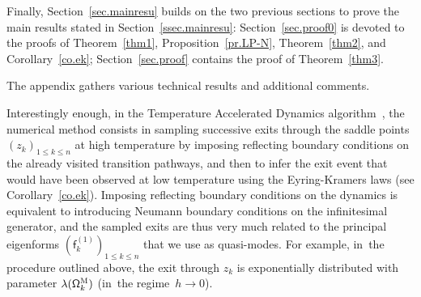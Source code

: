 Finally, Section~\ref{sec.mainresu} builds on the two previous sections
to prove the main results stated in Section~\ref{ssec.mainresu}: Section~\ref{sec.proof0} is devoted to the
proofs of Theorem~\ref{thm1}, Proposition~\ref{pr.LP-N},
Theorem~\ref{thm2}, and Corollary~\ref{co.ek}; Section~\ref{sec.proof}
contains the proof of Theorem~\ref{thm3}.

The appendix gathers various technical results and additional comments.

\begin{remark}\label{rem:TAD}
Interestingly enough, in
the Temperature Accelerated Dynamics
algorithm~\cite{sorensen-voter-00,aristoff-lelievre-14,di-gesu-lelievre-le-peutrec-nectoux-17}, the numerical method
consists in sampling successive exits through the saddle points
$(z_k)_{1 \le k \le n}$ at high temperature by imposing reflecting boundary conditions on
the already visited transition pathways, and then to infer the
exit event that would have been observed at low temperature using the
Eyring-Kramers laws (see Corollary~\ref{co.ek}). Imposing reflecting boundary conditions on
the dynamics is
equivalent to introducing Neumann boundary conditions on the
infinitesimal generator, and the sampled exits are thus very much
related to the principal eigenforms $(\mathsf f_k^{(1)})_{1 \le k \le n}$ that we use
as quasi-modes. For example, in~the procedure outlined above, the exit through $z_k$ is exponentially
distributed with parameter $\lambda(\mathsf
\Omega_k^{\textsc{M}})$ (in~the regime~$h \to 0$).
\end{remark}

